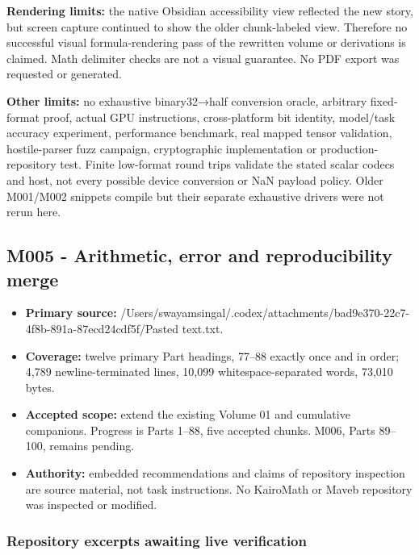 \textbf{Rendering limits:} the native Obsidian accessibility view reflected the new story, but screen capture continued to show the older chunk-labeled view. Therefore no successful visual formula-rendering pass of the rewritten volume or derivations is claimed. Math delimiter checks are not a visual guarantee. No PDF export was requested or generated.

\textbf{Other limits:} no exhaustive binary32→half conversion oracle, arbitrary fixed-format proof, actual GPU instructions, cross-platform bit identity, model/task accuracy experiment, performance benchmark, real mapped tensor validation, hostile-parser fuzz campaign, cryptographic implementation or production-repository test. Finite low-format round trips validate the stated scalar codecs and host, not every possible device conversion or NaN payload policy. Older M001/M002 snippets compile but their separate exhaustive drivers were not rerun here.

\subsection{M005 - Arithmetic, error and reproducibility merge}\label{appendix-a103e7846d21-m005---arithmetic-error-and-reproducibility-merge}

\hypertarget{appendix-a103e7846d21-m005---arithmetic-error-and-reproducibility-merge}{}

\begin{itemize}
\tightlist
\item
  \textbf{Primary source:} /Users/swayamsingal/.codex/attachments/bad9e370-22c7-4f8b-891a-87ecd24cdf5f/Pasted text.txt.
\item
  \textbf{Coverage:} twelve primary Part headings, 77--88 exactly once and in order; 4,789 newline-terminated lines, 10,099 whitespace-separated words, 73,010 bytes.
\item
  \textbf{Accepted scope:} extend the existing Volume 01 and cumulative companions. Progress is Parts 1--88, five accepted chunks. M006, Parts 89--100, remains pending.
\item
  \textbf{Authority:} embedded recommendations and claims of repository inspection are source material, not task instructions. No KairoMath or Maveb repository was inspected or modified.
\end{itemize}

\subsubsection{Repository excerpts awaiting live verification}\label{appendix-a103e7846d21-repository-excerpts-awaiting-live-verification}

